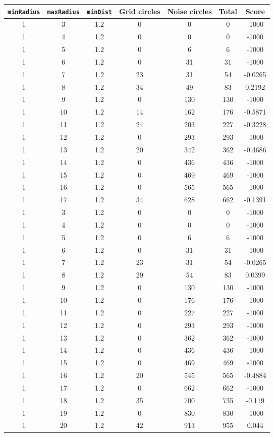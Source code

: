 \documentclass[letterpaper, 12pt]{article}
\begin{document}
\begin{longtable}{|c|c|c|c|c|c|c|}
\hline
\textbf{\texttt{minRadius}} & \textbf{\texttt{maxRadius}} & \textbf{\texttt{minDist}} & \textbf{Grid circles} & \textbf{Noise circles} & \textbf{Total} & \textbf{Score} \\
\hline
1 & 3 & 1.2 & 0 & 0 & 0 & -1000 \\
\hline
1 & 4 & 1.2 & 0 & 0 & 0 & -1000 \\
\hline
1 & 5 & 1.2 & 0 & 6 & 6 & -1000 \\
\hline
1 & 6 & 1.2 & 0 & 31 & 31 & -1000 \\
\hline
1 & 7 & 1.2 & 23 & 31 & 54 & -0.0265 \\
\hline
1 & 8 & 1.2 & 34 & 49 & 83 & 0.2192 \\
\hline
1 & 9 & 1.2 & 0 & 130 & 130 & -1000 \\
\hline
1 & 10 & 1.2 & 14 & 162 & 176 & -0.5871 \\
\hline
1 & 11 & 1.2 & 24 & 203 & 227 & -0.3228 \\
\hline
1 & 12 & 1.2 & 0 & 293 & 293 & -1000 \\
\hline
1 & 13 & 1.2 & 20 & 342 & 362 & -0.4686 \\
\hline
1 & 14 & 1.2 & 0 & 436 & 436 & -1000 \\
\hline
1 & 15 & 1.2 & 0 & 469 & 469 & -1000 \\
\hline
1 & 16 & 1.2 & 0 & 565 & 565 & -1000 \\
\hline
1 & 17 & 1.2 & 34 & 628 & 662 & -0.1391 \\
\hline
1 & 3 & 1.2 & 0 & 0 & 0 & -1000 \\
\hline
1 & 4 & 1.2 & 0 & 0 & 0 & -1000 \\
\hline
1 & 5 & 1.2 & 0 & 6 & 6 & -1000 \\
\hline
1 & 6 & 1.2 & 0 & 31 & 31 & -1000 \\
\hline
1 & 7 & 1.2 & 23 & 31 & 54 & -0.0265 \\
\hline
1 & 8 & 1.2 & 29 & 54 & 83 & 0.0399 \\
\hline
1 & 9 & 1.2 & 0 & 130 & 130 & -1000 \\
\hline
1 & 10 & 1.2 & 0 & 176 & 176 & -1000 \\
\hline
1 & 11 & 1.2 & 0 & 227 & 227 & -1000 \\
\hline
1 & 12 & 1.2 & 0 & 293 & 293 & -1000 \\
\hline
1 & 13 & 1.2 & 0 & 362 & 362 & -1000 \\
\hline
1 & 14 & 1.2 & 0 & 436 & 436 & -1000 \\
\hline
1 & 15 & 1.2 & 0 & 469 & 469 & -1000 \\
\hline
1 & 16 & 1.2 & 20 & 545 & 565 & -0.4884 \\
\hline
1 & 17 & 1.2 & 0 & 662 & 662 & -1000 \\
\hline
1 & 18 & 1.2 & 35 & 700 & 735 & -0.119 \\
\hline
1 & 19 & 1.2 & 0 & 830 & 830 & -1000 \\
\hline
1 & 20 & 1.2 & 42 & 913 & 955 & 0.044 \\
\hline
\end{longtable}
\end{document}
